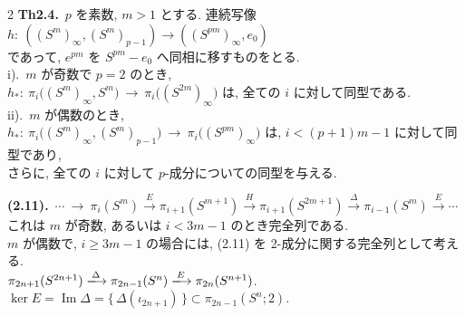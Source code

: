 \documentclass[10pt, leqno]{ltjsarticle}
\newcommand{\gen}[1]{\{\,#1\,\}}       %
\newcommand{\im}{\operatorname{Im}}
\newcommand{\pis}[2]{\pi_{#1}(#2)}       %
\numberwithin{equation}{section}
\theoremstyle{plain}
\theoremstyle{definition}
\theoremstyle{remark}
\begin{document}
\begin{paracol}{2}
\noindent
\textbf{Th2.4.}\
$p$ を素数, $m>1$ とする. 
連続写像
\(
h:\ ((S^m)_\infty,(S^m)_{p-1})\longrightarrow ((S^{pm})_\infty,e_0)
\)\\
であって, $e^{pm}$ を $S^{pm}-e_0$ へ同相に移すものをとる. \\
i).\ $m$ が奇数で $p=2$ のとき, \\
\(
h_*:\ \pi_i\bigl((S^m)_\infty,S^m\bigr)\ \longrightarrow\ \pi_i\bigl((S^{2m})_\infty\bigr)
\)
は, 全ての $i$ に対して同型である. \\
ii).\ $m$ が偶数のとき, \\
\(
h_*:\ \pi_i\bigl((S^m)_\infty,(S^m)_{p-1}\bigr)\ \longrightarrow\ 
\pi_i\bigl((S^{pm})_\infty\bigr)
\)
は, $i<(p+1)m-1$ に対して同型であり, \\
さらに, 全ての $i$ に対して $p$-成分についての同型を与える. 

\noindent
\textbf{(2.11).}\ 
\(\cdots\ \longrightarrow\ 
\pi_i(S^m)\xrightarrow{\,E\,}\pi_{i+1}(S^{m+1})\xrightarrow{\,H\,}
\pi_{i+1}(S^{2m+1})\xrightarrow{\,\Delta\,}\pi_{i-1}(S^m)\xrightarrow{\,E\,}\cdots
\)\\
これは $m$ が奇数, あるいは $i<3m-1$ のとき完全列である. \\
$m$ が偶数で, $i\ge 3m-1$ の場合には, (2.11) を
2-成分に関する完全列として考える. \\
\(\pis{2n+1}{S^{2n+1}}\xlongrightarrow{\Delta}
\pis{2n-1}{S^{n}}\xlongrightarrow{E}
\pis{2n}{S^{n+1}}\).\\
\(\ker E = \im \Delta = \gen{\Delta(\iota_{2n+1})}
\subset\pis{2n-1}{S^n; 2}\).


\end{paracol}
\end{document}

